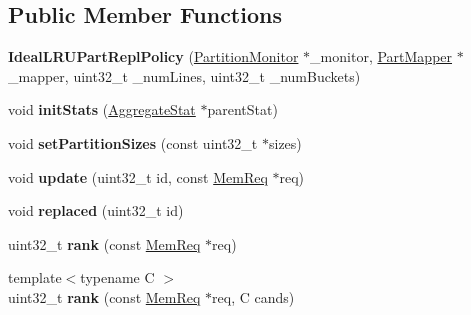 \subsection*{Public Member Functions}
\begin{DoxyCompactItemize}
\item 
\hypertarget{classIdealLRUPartReplPolicy_a76f9677a013029f467ae6289b9bb51af}{{\bfseries Ideal\-L\-R\-U\-Part\-Repl\-Policy} (\hyperlink{classPartitionMonitor}{Partition\-Monitor} $\ast$\-\_\-monitor, \hyperlink{classPartMapper}{Part\-Mapper} $\ast$\-\_\-mapper, uint32\-\_\-t \-\_\-num\-Lines, uint32\-\_\-t \-\_\-num\-Buckets)}\label{classIdealLRUPartReplPolicy_a76f9677a013029f467ae6289b9bb51af}

\item 
\hypertarget{classIdealLRUPartReplPolicy_a005d5fcb68c06b418eb0ccebcebcd833}{void {\bfseries init\-Stats} (\hyperlink{classAggregateStat}{Aggregate\-Stat} $\ast$parent\-Stat)}\label{classIdealLRUPartReplPolicy_a005d5fcb68c06b418eb0ccebcebcd833}

\item 
\hypertarget{classIdealLRUPartReplPolicy_acf0338dd7fa8e41ba79f1941aa60a67c}{void {\bfseries set\-Partition\-Sizes} (const uint32\-\_\-t $\ast$sizes)}\label{classIdealLRUPartReplPolicy_acf0338dd7fa8e41ba79f1941aa60a67c}

\item 
\hypertarget{classIdealLRUPartReplPolicy_a8d1da4cc3170f608737c400221114ac5}{void {\bfseries update} (uint32\-\_\-t id, const \hyperlink{structMemReq}{Mem\-Req} $\ast$req)}\label{classIdealLRUPartReplPolicy_a8d1da4cc3170f608737c400221114ac5}

\item 
\hypertarget{classIdealLRUPartReplPolicy_a9c5af0e93e754830f267fa9a5e81967c}{void {\bfseries replaced} (uint32\-\_\-t id)}\label{classIdealLRUPartReplPolicy_a9c5af0e93e754830f267fa9a5e81967c}

\item 
\hypertarget{classIdealLRUPartReplPolicy_a1b346d9edf01a4b38720782ef261ebba}{uint32\-\_\-t {\bfseries rank} (const \hyperlink{structMemReq}{Mem\-Req} $\ast$req)}\label{classIdealLRUPartReplPolicy_a1b346d9edf01a4b38720782ef261ebba}

\item 
\hypertarget{classIdealLRUPartReplPolicy_ae8d8a5ab116569a643ff191bb4848a59}{{\footnotesize template$<$typename C $>$ }\\uint32\-\_\-t {\bfseries rank} (const \hyperlink{structMemReq}{Mem\-Req} $\ast$req, C cands)}\label{classIdealLRUPartReplPolicy_ae8d8a5ab116569a643ff191bb4848a59}


\end{DoxyCompactItemize}
